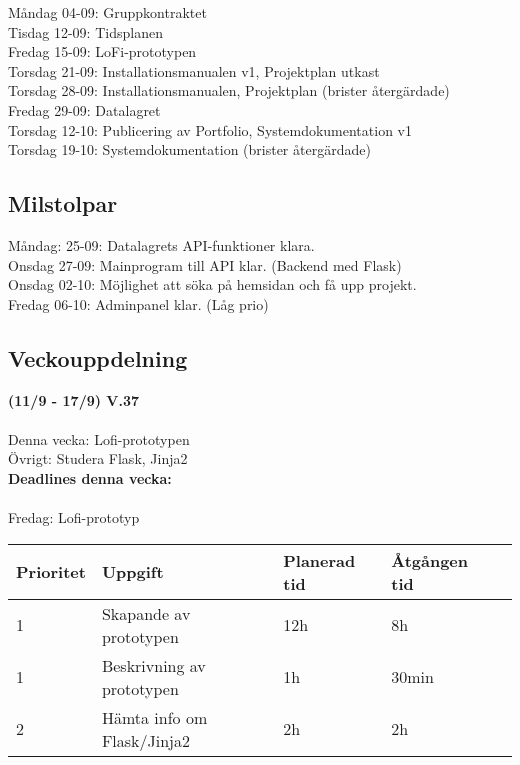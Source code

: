 \documentclass{TDP003mall}
\begin{document}
Måndag 04-09: Gruppkontraktet\\
Tisdag 12-09: Tidsplanen\\
Fredag 15-09: LoFi-prototypen\\
Torsdag 21-09: Installationsmanualen v1, Projektplan utkast\\
Torsdag 28-09: Installationsmanualen, Projektplan (brister återgärdade)\\
Fredag 29-09: Datalagret\\
Torsdag 12-10: Publicering av Portfolio, Systemdokumentation v1\\
Torsdag 19-10: Systemdokumentation (brister återgärdade)\\

\subsection{Milstolpar}
Måndag: 25-09: Datalagrets API-funktioner klara.\\
Onsdag 27-09: Mainprogram till API klar. (Backend med Flask)\\
Onsdag 02-10: Möjlighet att söka på hemsidan och få upp projekt.\\
Fredag 06-10: Adminpanel klar. (Låg prio)\\

\subsection{Veckouppdelning}
\textbf{(11/9 - 17/9) V.37}\\\\
Denna vecka: Lofi-prototypen\\
Övrigt: Studera Flask, Jinja2\\

\textbf{Deadlines denna vecka: }\\\\
Fredag: Lofi-prototyp

\begin{table}[]
  \begin{tabular}{|l|l|l|l|l|}
  \hline
   Prioritet & Uppgift                    & Planerad tid & Åtgången tid \\ \hline
   1         & Skapande av prototypen     & 12h          & 8h           \\ \hline
   1         & Beskrivning av prototypen  & 1h           & 30min        \\ \hline
   2         & Hämta info om Flask/Jinja2 & 2h           & 2h           \\ \hline
  \end{tabular}
  \end{table}
\end{document}

